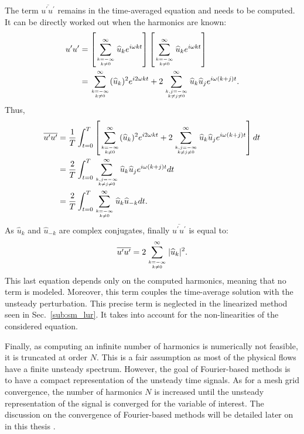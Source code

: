 The term $\overline{u^\prime u^\prime}$ remains in the time-averaged
equation and needs to be computed. It can be 
directly worked out when the harmonics are known:
\begin{equation}
	\begin{split}
		u^\prime u^\prime &= 
		\left[
			\sum_{k=-\infty \atop k \neq 0}^{\infty} \widehat{u}_k e^{i \omega k t} 
		\right]
		\left[
			\sum_{k=-\infty \atop k \neq 0}^{\infty} \widehat{u}_k e^{i \omega k t} 
		\right] \\
		&= \sum_{k=-\infty \atop k \neq 0}^{\infty} (\widehat{u}_k)^2
		   e^{i 2 \omega k t} +
		   2 \sum_{k,j=-\infty \atop k \neq j \neq 0}^{\infty} 
		   \widehat{u}_k \widehat{u}_j e^{i \omega (k + j) t}.
	\end{split}
\end{equation}
Thus,
\begin{equation}
	\begin{split}
		\overline{u^\prime u^\prime} &= 
		\frac{1}{T} \int_{t=0}^{T} \left[ 
			\sum_{k=-\infty \atop k \neq 0}^{\infty} (\widehat{u}_k)^2
		   	e^{i 2 \omega k t} +
		   	2 \sum_{k,j=-\infty \atop k \neq j \neq 0}^{\infty} 
		   	\widehat{u}_k \widehat{u}_j e^{i \omega (k + j) t} 
		\right] dt\\
		&= \frac{2}{T} \int_{t=0}^{T} \sum_{k,j=-\infty \atop k \neq j \neq 0}^{\infty} 
		   	\widehat{u}_k \widehat{u}_j 
		   	e^{i \omega (k + j) t} dt \\
		&= \frac{2}{T} \int_{t=0}^{T} 
			\sum_{k=-\infty \atop k \neq 0}^{\infty} 
			\widehat{u}_k \widehat{u}_{-k}  dt.
	\end{split}
\end{equation}
As $\widehat{u}_k$ and $\widehat{u}_{-k}$ are complex conjugates,
finally $\overline{u^\prime u^\prime}$ is equal to:
\begin{equation}
	\overline{u^\prime u^\prime} = 
	2 \sum_{k=-\infty \atop k \neq 0}^{\infty} |\widehat{u}_k|^2.
	\label{eq:sm_nlh_deterministic_stress_terms}
\end{equation}
This last equation depends only on the computed harmonics, meaning
that no term is modeled. Moreover, this term couples the
time-average solution with the unsteady perturbation. This precise
term is neglected in the linearized method seen in 
Sec.~\ref{sub:sm_lur}. It takes into account for the 
non-linearities of the considered equation.

Finally, as computing an infinite number of harmonics is 
numerically not feasible,
it is truncated at order $N$. 
This is a fair assumption as most
of the physical flows have a finite unsteady spectrum.
However, the goal of Fourier-based
methods is to have a compact representation of the unsteady time
signals. As for a mesh grid convergence, the number of harmonics $N$
is increased until the unsteady representation of the signal is
converged for the variable of interest. The discussion on the
convergence of Fourier-based methods will be detailed later on in this 
thesis .

